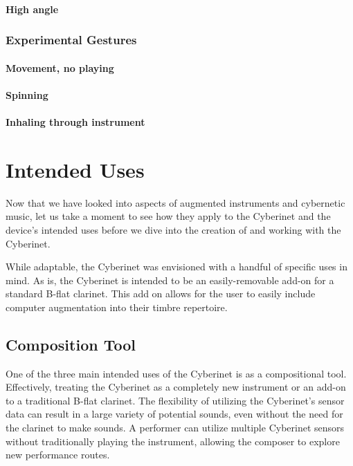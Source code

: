 \subsubsection{High angle}




\subsection{Experimental Gestures}



\subsubsection{Movement, no playing}



\subsubsection{Spinning}



\subsubsection{Inhaling through instrument}







\chapter{Intended Uses}
Now that we have looked into aspects of augmented instruments and cybernetic music, let us take a moment to see how they apply to the Cyberinet and the device's intended uses before we dive into the creation of and working with the Cyberinet.

While adaptable, the Cyberinet was envisioned with a handful of specific uses in mind. As is, the Cyberinet is intended to be an easily-removable add-on for a standard B-flat clarinet. This add on allows for the user to easily include computer augmentation into their timbre repertoire. 

\section{Composition Tool}
One of the three main intended uses of the Cyberinet is as a compositional tool. Effectively, treating the Cyberinet as a completely new instrument or an add-on to a traditional B-flat clarinet. The flexibility of utilizing the Cyberinet's sensor data can result in a large variety of potential sounds, even without the need for the clarinet to make sounds. A performer can utilize multiple Cyberinet sensors without traditionally playing the instrument, allowing the composer to explore new performance routes.


